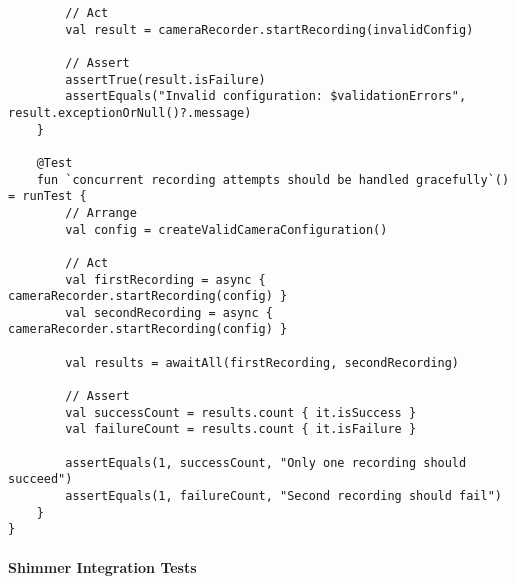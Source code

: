 \documentclass[12pt,a4paper]{article}
\begin{document}
\begin{verbatim}
        // Act
        val result = cameraRecorder.startRecording(invalidConfig)
        
        // Assert
        assertTrue(result.isFailure)
        assertEquals("Invalid configuration: $validationErrors", result.exceptionOrNull()?.message)
    }
    
    @Test
    fun `concurrent recording attempts should be handled gracefully`() = runTest {
        // Arrange
        val config = createValidCameraConfiguration()
        
        // Act
        val firstRecording = async { cameraRecorder.startRecording(config) }
        val secondRecording = async { cameraRecorder.startRecording(config) }
        
        val results = awaitAll(firstRecording, secondRecording)
        
        // Assert
        val successCount = results.count { it.isSuccess }
        val failureCount = results.count { it.isFailure }
        
        assertEquals(1, successCount, "Only one recording should succeed")
        assertEquals(1, failureCount, "Second recording should fail")
    }
}
\end{verbatim}

\paragraph{Shimmer Integration Tests}
\end{document}
